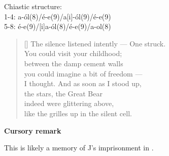 \documentclass[a4paper,12pt,twoside,final]{book}
\begin{document}
\noindent Chiastic structure: \\
1-4: a-ól(8)/é-e(9)/a[i]-ól(9)/é-e(9) \\
5-8: é-e(9)/[i]a-ól(8)/é-e(9)/a-ol(8)

\newpage


\settowidth{\versewidth}{The silence listened intently --- One struck.}

\begin{verse}[\versewidth]
  The silence listened intently --- One struck. \\
  You could visit your childhood; \\
  between the damp cement walls \\
  you could imagine a bit of freedom --- \\
  I thought. And as soon as I stood up, \\
  the stars, the Great Bear \\
  indeed were glittering above, \\
  like the grilles up in the silent cell. \\
\end{verse}


\bigskip

\noindent \textbf{Cursory remark}

\medskip

This is likely a memory of J's imprisonment in .

\newpage

\settowidth{\versewidth}{gondoltam. S hát hát amint fölállok}
\end{document}
